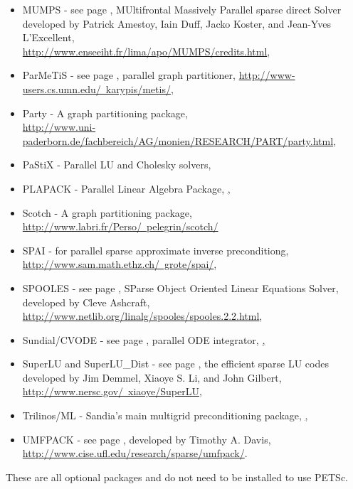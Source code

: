 \begin{itemize}
  \item MUMPS -      see page \pageref{sec_externalsol}, MUltifrontal Massively Parallel sparse direct Solver developed by Patrick Amestoy, 
                     Iain Duff, Jacko Koster, and Jean-Yves L'Excellent, \\
                     \href{http://www.enseeiht.fr/lima/apo/MUMPS/credits.html}{http://www.enseeiht.fr/lima/apo/MUMPS/credits.html},
  \item ParMeTiS -     see page \pageref{sec_partitioning}, parallel graph partitioner,
                     \href{http://www-users.cs.umn.edu/~karypis/metis/}{http://www-users.cs.umn.edu/~karypis/metis/},
  \item Party -     A graph partitioning package, \\ \href{http://www.uni-paderborn.de/fachbereich/AG/monien/RESEARCH/PART/party.html}{http://www.uni-paderborn.de/fachbereich/AG/monien/RESEARCH/PART/party.html},
  \item PaStiX -     Parallel LU and Cholesky solvers,
  \item PLAPACK - Parallel Linear Algebra Package, \href{http://www.cs.utexas.edu/users/plapack/},
  \item Scotch -     A graph partitioning package, \href{http://www.labri.fr/Perso/~pelegrin/scotch/}{http://www.labri.fr/Perso/~pelegrin/scotch/}
  \item SPAI -        for parallel sparse approximate inverse preconditiong, 
                     \href{http://www.sam.math.ethz.ch/~grote/spai/}{http://www.sam.math.ethz.ch/~grote/spai/},
  \item SPOOLES - see page \pageref{sec_externalsol}, SParse Object Oriented Linear Equations Solver, developed by Cleve Ashcraft, 
                    \href{http://www.netlib.org/linalg/spooles/spooles.2.2.html}{http://www.netlib.org/linalg/spooles/spooles.2.2.html},
  \item Sundial/CVODE - see page \pageref{sec_sundials}, parallel ODE integrator,
                     \href{http://www.llnl.gov/CASC/sundials/},
  \item SuperLU and SuperLU\_Dist - see page \pageref{sec_externalsol}, 
                    the efficient sparse LU codes developed by Jim Demmel,  Xiaoye S. Li, and John Gilbert, 
                    \href{http://www.nersc.gov/~xiaoye/SuperLU}{http://www.nersc.gov/~xiaoye/SuperLU},
  \item Trilinos/ML - Sandia's main multigrid preconditioning package, \href{http://software.sandia.gov/trilinos/},
  \item UMFPACK - see page \pageref{sec_externalsol}, 
                    developed by Timothy A. Davis, 
                    \href{http://www.cise.ufl.edu/research/sparse/umfpack/}{http://www.cise.ufl.edu/research/sparse/umfpack/}.
\end{itemize}
These are all optional packages and do not need to be installed to use PETSc.

